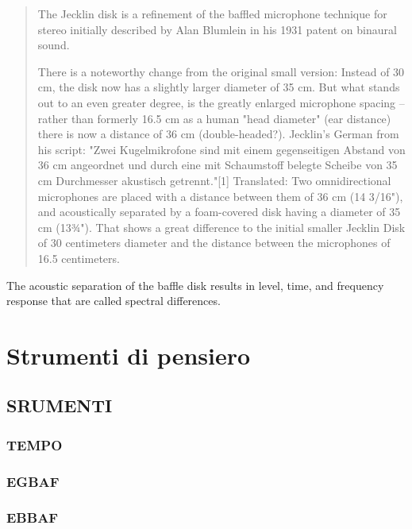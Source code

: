 \documentclass[a4paper,11pt]{article}
\begin{document}
\begin{quotation}
The Jecklin disk is a refinement of the baffled microphone technique
for stereo initially described by Alan Blumlein in his 1931 patent on
binaural sound.

There is a noteworthy change from the original small version: Instead
of 30 cm, the disk now has a slightly larger diameter of 35 cm. But
what stands out to an even greater degree, is the greatly enlarged
microphone spacing -- rather than formerly 16.5 cm as a human "head
diameter" (ear distance) there is now a distance of 36 cm
(double-headed?). Jecklin's German from his script: "Zwei
Kugelmikrofone sind mit einem gegenseitigen Abstand von 36 cm
angeordnet und durch eine mit Schaumstoff belegte Scheibe von 35 cm
Durchmesser akustisch getrennt."{[}1{]} Translated: Two omnidirectional
microphones are placed with a distance between them of 36 cm (14
3/16"), and acoustically separated by a foam-covered disk having a
diameter of 35 cm (13¾"). That shows a great difference to the
initial smaller Jecklin Disk of 30 centimeters diameter and the
distance between the microphones of 16.5 centimeters.
\end{quotation}

The acoustic separation of the baffle disk results in level, time, and
frequency response that are called spectral differences.

\section{Strumenti di pensiero}\hypertarget{strumenti-di-pensiero}{}\label{strumenti-di-pensiero}

\subsection{SRUMENTI}\hypertarget{srumenti}{}\label{srumenti}

\subsubsection{TEMPO}\hypertarget{tempo}{}\label{tempo}

\subsubsection{EGBAF}\hypertarget{egbaf}{}\label{egbaf}

\subsubsection{EBBAF}\hypertarget{ebbaf}{}\label{ebbaf}
\end{document}
